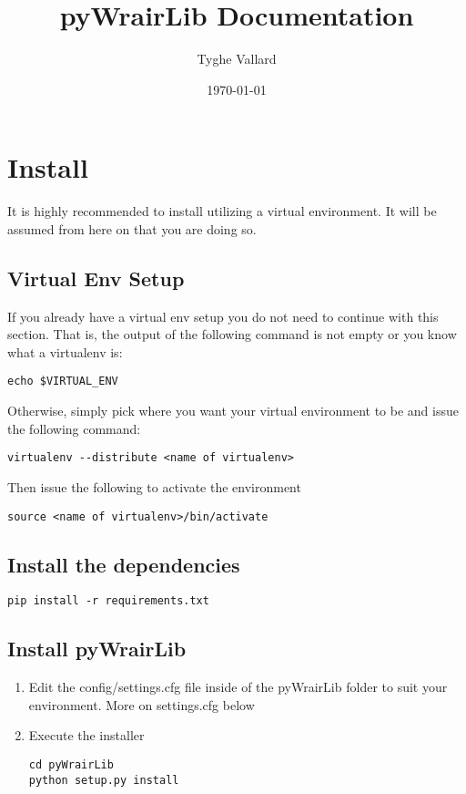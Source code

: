 \documentclass{article}
\begin{document}
\title{pyWrairLib Documentation}
\author{Tyghe Vallard}
\date{\today}
\maketitle
\tableofcontents

\section{Install}
It is highly recommended to install utilizing a virtual environment. It will be assumed from here on that you are doing so.

\subsection{Virtual Env Setup}
If you already have a virtual env setup you do not need to continue with this section.
That is, the output of the following command is not empty or you know what a virtualenv is:
\begin{lstlisting}
echo $VIRTUAL_ENV
\end{lstlisting}
Otherwise, simply pick where you want your virtual environment to be and issue the following command:

\begin{lstlisting}
virtualenv --distribute <name of virtualenv>
\end{lstlisting}

Then issue the following to activate the environment

\begin{lstlisting}
source <name of virtualenv>/bin/activate
\end{lstlisting}

\subsection{Install the dependencies}
\begin{lstlisting}
pip install -r requirements.txt
\end{lstlisting}

\subsection{Install pyWrairLib}
\begin{enumerate}
 \item Edit the config/settings.cfg file inside of the pyWrairLib folder to suit your environment. More on settings.cfg below
 \item Execute the installer
\begin{lstlisting}
cd pyWrairLib
python setup.py install
\end{lstlisting}
\end{enumerate}
\end{document}
